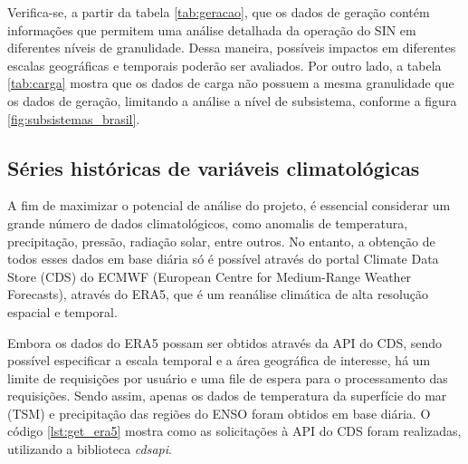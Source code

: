 \begin{table}[htb]
  \centering
\end{table}

Verifica-se, a partir da tabela \ref{tab:geracao}, que os dados de geração contém informações que permitem uma análise 
detalhada da operação do SIN em diferentes níveis de granulidade. Dessa maneira, possíveis impactos em diferentes 
escalas geográficas e temporais poderão ser avaliados. Por outro lado, a tabela \ref{tab:carga} mostra que os dados de
carga não possuem a mesma granulidade que os dados de geração, limitando a análise a nível de subsistema, conforme a
figura \ref{fig:subsistemas_brasil}.

\subsection{Séries históricas de variáveis climatológicas}
A fim de maximizar o potencial de análise do projeto, é essencial considerar um grande número de dados climatológicos, 
como anomalis de temperatura, precipitação, pressão, radiação solar, entre outros. No entanto, a obtenção de todos esses
dados em base diária só é possível através do portal Climate Data Store (CDS) do ECMWF (European Centre for Medium-Range
 Weather Forecasts), através do ERA5, que é um reanálise climática de alta resolução espacial e temporal. \cite{C3S2024}

Embora os dados do ERA5 possam ser obtidos através da API do CDS, sendo possível especificar a escala temporal e a área
geográfica de interesse, há um limite de requisições por usuário e uma file de espera para o processamento das 
requisições. Sendo assim, apenas os dados de temperatura da superfície do mar (TSM) e precipitação das regiões do ENSO 
foram obtidos em base diária. O código \ref{lst:get_era5} mostra como as solicitações à API do CDS foram realizadas,
utilizando a biblioteca \textit{cdsapi}.

